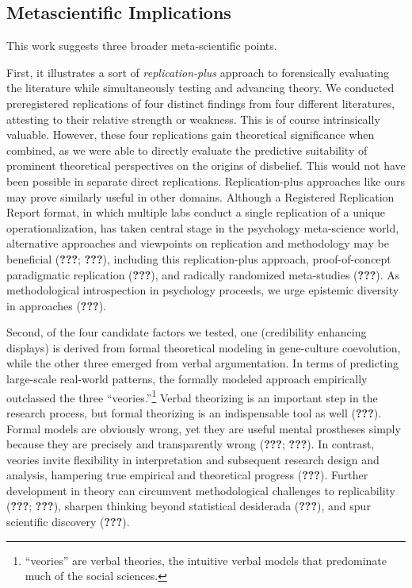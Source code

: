 \documentclass[english,man,mask]{article}
\begin{document}
\hypertarget{metascientific-implications}{%
\subsection{Metascientific Implications}\label{metascientific-implications}}

This work suggests three broader meta-scientific points.

First, it illustrates a sort of \emph{replication-plus} approach to forensically evaluating the literature while simultaneously testing and advancing theory. We conducted preregistered replications of four distinct findings from four different literatures, attesting to their relative strength or weakness. This is of course intrinsically valuable. However, these four replications gain theoretical significance when combined, as we were able to directly evaluate the predictive suitability of prominent theoretical perspectives on the origins of disbelief. This would not have been possible in separate direct replications. Replication-plus approaches like ours may prove similarly useful in other domains. Although a Registered Replication Report format, in which multiple labs conduct a single replication of a unique operationalization, has taken central stage in the psychology meta-science world, alternative approaches and viewpoints on replication and methodology may be beneficial ({\textbf{???}}; {\textbf{???}}), including this replication-plus approach, proof-of-concept paradigmatic replication ({\textbf{???}}), and radically randomized meta-studies ({\textbf{???}}). As methodological introspection in psychology proceeds, we urge epistemic diversity in approaches ({\textbf{???}}).

Second, of the four candidate factors we tested, one (credibility enhancing displays) is derived from formal theoretical modeling in gene-culture coevolution, while the other three emerged from verbal argumentation. In terms of predicting large-scale real-world patterns, the formally modeled approach empirically outclassed the three \enquote{veories.}\footnote{\enquote{veories} are verbal theories, the intuitive verbal models that predominate much of the social sciences.} Verbal theorizing is an important step in the research process, but formal theorizing is an indispensable tool as well ({\textbf{???}}). Formal models are obviously wrong, yet they are useful mental prostheses simply because they are precisely and transparently wrong ({\textbf{???}}; {\textbf{???}}). In contrast, veories invite flexibility in interpretation and subsequent research design and analysis, hampering true empirical and theoretical progress ({\textbf{???}}). Further development in theory can circumvent methodological challenges to replicability ({\textbf{???}}; {\textbf{???}}), sharpen thinking beyond statistical desiderada ({\textbf{???}}), and spur scientific discovery ({\textbf{???}}).
\end{document}
